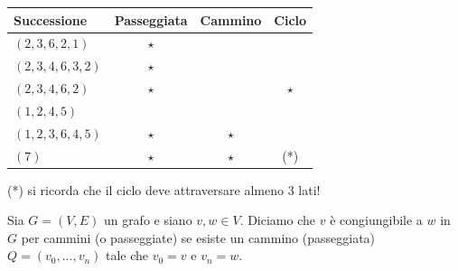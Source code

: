 \documentclass[oneside]{book}
\theoremstyle{remark}
\newcommand{\head}[1]{\textnormal{\textbf{#1}}} %
\begin{document}
\begin{center}
\begin{tabular}{lccc}
\hline
\head{Successione}   & \head{Passeggiata} & \head{Cammino} & \head{Ciclo}\\
\hline
$(2,3,6,2,1)$     & $\star$            &                &\\
$(2,3,4,6,3,2)$   & $\star$            &                &\\
$(2,3,4,6,2)$     & $\star$            &                & $\star$\\
$(1,2,4,5)$       &                    &                &\\
$(1,2,3,6,4,5)$   & $\star$            & $\star$        &\\
$(7)$             & $\star$            & $\star$        &(*)\\
\hline
\end{tabular}
\end{center}
(*) si ricorda che il ciclo deve attraversare almeno 3 lati!

\begin{tcolorbox}[colback=yellow!30, colframe=yellow!30!black, title={Vertici congiungibili}]
Sia $G=(V,E)$ un grafo e siano $v,w \in V$. Diciamo che $v$ è congiungibile a
$w$ in $G$ per cammini (o passeggiate) se esiste un cammino (passeggiata)
$Q=(v_0,...,v_n)$ tale che $v_0=v$ e $v_n = w$.
\end{tcolorbox}
\end{document}
